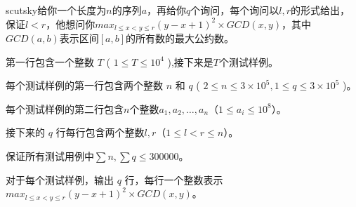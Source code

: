 
scutsky给你一个长度为$n$的序列$a$，再给你$q$个询问，每个询问以$l,r$的形式给出，保证$l<r$，他想问你$max_{l\leqslant x<y\leqslant r}(y-x+1)^2\times GCD(x,y)$，其中$GCD(a,b)$表示区间$[a,b]$的所有数的最大公约数。


第一行包含一个整数 $T$ ( $1\leqslant T \leqslant 10^4$  ),接下来是$T$个测试样例。


每个测试样例的第一行包含两个整数 $n$ 和 $q$ ( $2\leqslant n \leqslant 3\times 10^5,1\leqslant q\leqslant 3\times 10^5$ )。

每个测试样例的第二行包含$n$个整数$a_1, a_2, \dots, a_n$（$1 \leqslant a_i \leqslant 10^8$）。

接下来的 $q$ 行每行包含两个整数$l ,r$（$1 \leqslant l < r \leqslant n$）。

保证所有测试用例中$\sum n , \sum q \leqslant 300000$。


对于每个测试样例，输出 $q$ 行，每行一个整数表示$max_{l\leqslant x<y\leqslant r}(y-x+1)^2\times GCD(x,y)$。

